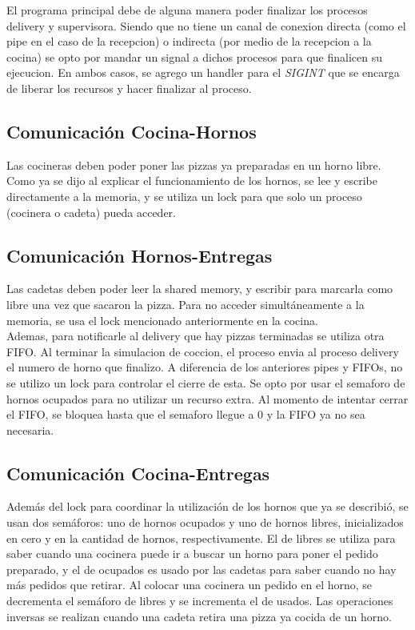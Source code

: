 \documentclass[11pt,spanish,a4paper,openany,notitlepage]{article}
\begin{document}
El programa principal debe de alguna manera poder finalizar los procesos delivery y supervisora. Siendo
que no tiene un canal de conexion directa (como el pipe en el caso de la recepcion) o indirecta (por medio de la recepcion a la cocina)
se opto por mandar un signal a dichos procesos para que finalicen su ejecucion. En ambos casos, se agrego
un handler para el \textit{SIGINT} que se encarga de liberar los recursos y hacer finalizar al proceso.

\subsection{Comunicación Cocina-Hornos}

Las cocineras deben poder poner las pizzas ya preparadas en un horno libre. Como ya se dijo al 
explicar el funcionamiento de los hornos, se lee y escribe directamente a la memoria, y se utiliza 
un lock para que solo un proceso (cocinera o cadeta) pueda acceder.

\subsection{Comunicación Hornos-Entregas}

Las cadetas deben poder leer la shared memory, y escribir para marcarla como libre una vez que 
sacaron la pizza. Para no acceder simultáneamente a la memoria, se usa el lock mencionado 
anteriormente en la cocina.\\
Ademas, para notificarle al delivery que hay pizzas terminadas se utiliza otra FIFO. Al terminar
la simulacion de coccion, el proceso envia al proceso delivery el numero de horno que finalizo.
A diferencia de los anteriores pipes y FIFOs, no se utilizo un lock para controlar el cierre de esta.
Se opto por usar el semaforo de hornos ocupados para no utilizar un recurso extra. Al momento de
intentar cerrar el FIFO, se bloquea hasta que el semaforo llegue a 0 y la FIFO ya no sea necesaria.

\subsection{Comunicación Cocina-Entregas}

Además del lock para coordinar la utilización de los hornos que ya se describió, se usan dos 
semáforos: uno de hornos ocupados y uno de hornos libres, inicializados en cero y en la cantidad de 
hornos, respectivamente. El de libres se utiliza para saber cuando una cocinera puede ir a buscar 
un horno para poner el pedido preparado, y el de ocupados es usado por las cadetas para saber 
cuando no hay más pedidos que retirar. Al colocar una cocinera un pedido en el horno, se decrementa 
el semáforo de libres y se incrementa el de usados. Las operaciones inversas se realizan cuando una 
cadeta retira una pizza ya cocida de un horno.\\
\end{document}
